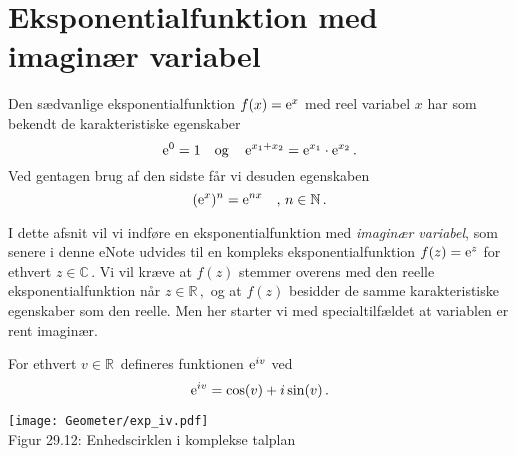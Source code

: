 \section{Eksponentialfunktion med imaginær variabel}

Den sædvanlige eksponentialfunktion $f(x)=\mathrm{e}^x$ med reel variabel $x$ har som bekendt de karakteristiske egenskaber 
\begin{equation}
\mathrm{e}^0=1\quad \mathrm{og} \quad\,\mathrm{e}^{x_1+x_2}=\mathrm{e}^{x_1}\cdot\mathrm{e}^{x_2}\,.
\end{equation}
Ved gentagen brug af den sidste får vi desuden  egenskaben 
\begin{equation}
(\mathrm{e}^{x})^n=\mathrm{e}^{nx}\quad ,\,n\in \mathbb N\,.
\end{equation}

I dette afsnit vil vi indføre en  eksponentialfunktion med \textit{imaginær variabel}, som senere i denne eNote udvides til en kompleks eksponentialfunktion $f(z)=\mathrm{e}^z$ for ethvert $z\in \mathbb C\,$. Vi vil kræve at $f(z)$ stemmer overens med den reelle eksponentialfunktion når $z\in \mathbb R\,,$ og at $f(z)$ besidder de samme karakteristiske egenskaber som den reelle. Men her starter vi med specialtilfældet at variablen er rent imaginær.

\begin{definition}\label{tn29_eiy}
For ethvert $v\in \mathbb R\,$ defineres funktionen  $\mathrm{e}^{iv}$ ved
\begin{equation}
\mathrm{e}^{iv}=\cos(v)+i\sin(v)\,.
\end{equation}
\begin{center}
	\texttt{[image: Geometer/exp\_iv.pdf]}\\
Figur 29.12: Enhedscirklen i komplekse talplan 
\end{center}
\end{definition}


